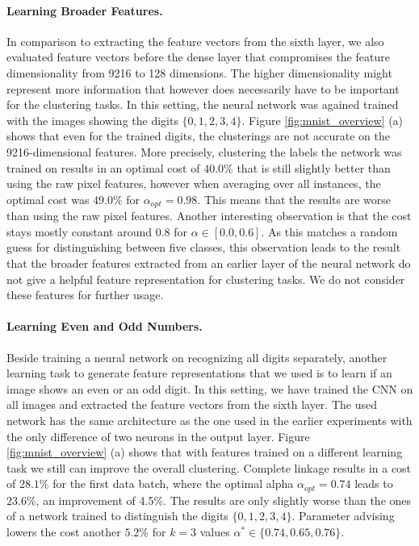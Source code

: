 \paragraph{Learning Broader Features.} In comparison to extracting the feature vectors from the sixth layer, we also evaluated feature vectors before the dense layer that compromises the feature dimensionality from 9216 to 128 dimensions. The higher dimensionality might represent more information that however does necessarily have to be important for the clustering tasks. In this setting, the neural network was agained trained with the images showing the digits $\{0,1,2,3,4\}$. Figure \ref{fig:mnist_overview} (a) shows that even for the trained digits, the clusterings are not accurate on the 9216-dimensional features. More precisely, clustering the labels the network was trained on results in an optimal cost of $40.0\%$ that is still slightly better than using the raw pixel features, however when averaging over all instances, the optimal cost was $49.0\%$ for $\alpha_{opt} = 0.98$. This means that the results are worse than using the raw pixel features. Another interesting observation is that the cost stays mostly constant around $0.8$ for $\alpha \in [0.0,0.6]$. As this matches a random guess for distinguishing between five classes, this observation leads to the result that the broader features extracted from an earlier layer of the neural network do not give a helpful feature representation for clustering tasks. We do not consider these features for further usage.

\paragraph{Learning Even and Odd Numbers.} Beside training a neural network on recognizing all digits separately, another learning task to generate feature representations that we used is to learn if an image shows an even or an odd digit. In this setting, we have trained the CNN on all images and extracted the feature vectors from the sixth layer. The used network has the same architecture as the one used in the earlier experiments with the only difference of two neurons in the output layer. Figure \ref{fig:mnist_overview} (a) shows that with features trained on a different learning task we still can improve the overall clustering. Complete linkage results in a cost of $28.1\%$ for the first data batch, where the optimal alpha $\alpha_{opt} = 0.74$ leads to $23.6\%$, an improvement of 4.5\%. The results are only slightly worse than the ones of a network trained to distinguish the digits $\{0,1,2,3,4\}$. Parameter advising lowers the cost another $5.2\%$ for $k = 3$ values $\alpha^* \in \{0.74, 0.65, 0.76\}$.\\

